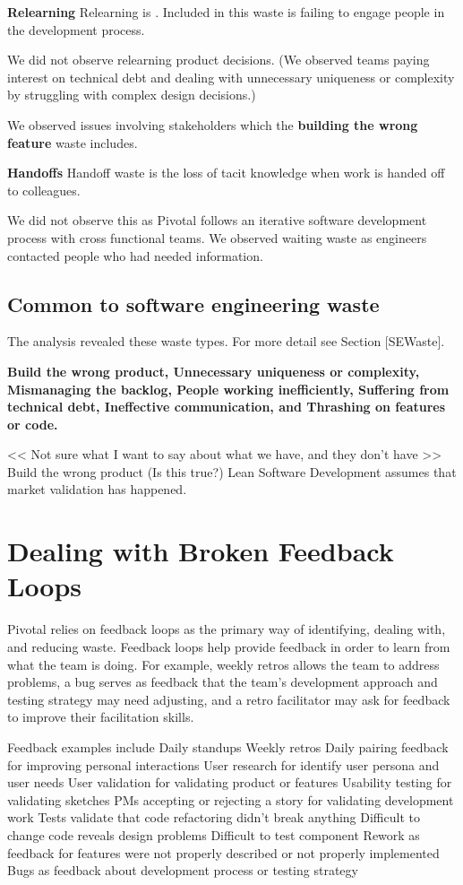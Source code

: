 \textbf{Relearning}
Relearning is  \cite{PoppendieckConceptToCash}. Included in this waste is failing to engage people in the development process. 

We did not observe relearning product decisions. (We observed teams paying interest on technical debt and dealing with unnecessary uniqueness or complexity by struggling with complex design decisions.)

We observed issues involving stakeholders which the \textbf{building the wrong feature} waste includes.

\textbf{Handoffs}
Handoff waste is the loss of tacit knowledge when work is handed off to colleagues.

We did not observe this as Pivotal follows an iterative software development process with cross functional teams. We observed waiting waste as engineers contacted people who had needed information. 
\subsection{Common to software engineering waste}
The analysis revealed these waste types. For more detail see Section [SEWaste].

\textbf{Build the wrong product, Unnecessary uniqueness or complexity,  Mismanaging the backlog, People working inefficiently, Suffering from technical debt, Ineffective communication, and Thrashing on features or code.}

<< Not sure what I want to say about what we have, and they don't have >>
Build the wrong product
(Is this true?) Lean Software Development assumes that market validation has happened.



\section{Dealing with Broken Feedback Loops}
Pivotal relies on feedback loops as the primary way of identifying, dealing with, and reducing waste. Feedback loops help provide feedback in order to learn from what the team is doing. For example, weekly retros allows the team to address problems, a bug serves as feedback that the team's development approach and testing strategy may need adjusting, and a retro facilitator may ask for feedback to improve their facilitation skills.

Feedback examples include
Daily standups
Weekly retros
Daily pairing feedback for improving personal interactions
User research for identify user persona and user needs
User validation for validating product or features
Usability testing for validating sketches
PMs accepting or rejecting a story for validating development work
Tests validate that code refactoring didn't break anything
Difficult to change code reveals design problems
Difficult to test component
Rework as feedback for features were not properly described or not properly implemented
Bugs as feedback about development process or testing strategy 

